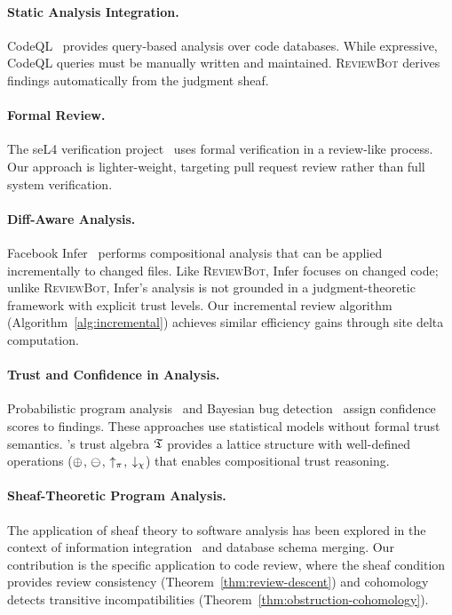 \documentclass[11pt]{article}
\newcommand{\ReviewBot}{\textsc{ReviewBot}}
\begin{document}
\paragraph{Static Analysis Integration.}
CodeQL~\cite{codeql} provides query-based analysis over code databases.
While expressive, CodeQL queries must be manually written and maintained.
\ReviewBot{} derives findings automatically from the judgment sheaf.

\paragraph{Formal Review.}
The seL4 verification project~\cite{klein2009sel4} uses formal verification
in a review-like process. Our approach is lighter-weight, targeting pull
request review rather than full system verification.

\paragraph{Diff-Aware Analysis.}
Facebook Infer~\cite{calcagno2015infer} performs compositional analysis
that can be applied incrementally to changed files. Like \ReviewBot{},
Infer focuses on changed code; unlike \ReviewBot{}, Infer's analysis
is not grounded in a judgment-theoretic framework with explicit trust
levels. Our incremental review algorithm
(Algorithm~\ref{alg:incremental}) achieves similar efficiency gains
through site delta computation.

\paragraph{Trust and Confidence in Analysis.}
Probabilistic program analysis~\cite{cousot2012probabilistic} and
Bayesian bug detection~\cite{kremenek2003z} assign confidence scores
to findings. These approaches use statistical models without formal
trust semantics. \JuGeo{}'s trust algebra $\mathfrak{T}$ provides a lattice
structure with well-defined operations ($\oplus$, $\ominus$,
$\uparrow_\pi$, $\downarrow_\chi$) that enables compositional trust reasoning.

\paragraph{Sheaf-Theoretic Program Analysis.}
The application of sheaf theory to software analysis has been explored
in the context of information integration~\cite{goguen1992sheaf} and
database schema merging. Our contribution is the specific application
to code review, where the sheaf condition provides review consistency
(Theorem~\ref{thm:review-descent}) and cohomology detects transitive
incompatibilities (Theorem~\ref{thm:obstruction-cohomology}).
\end{document}
